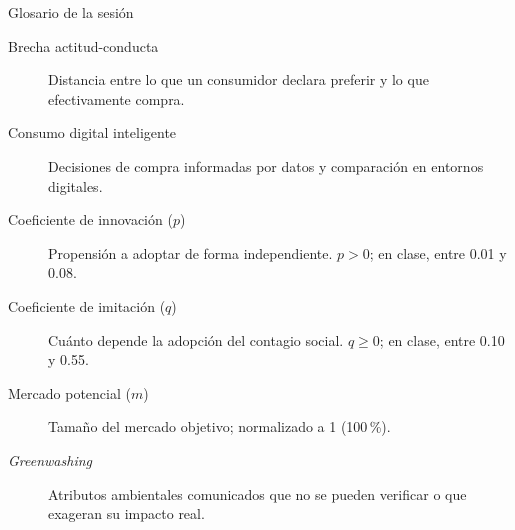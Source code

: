 \documentclass[aspectratio=169,xcolor=dvipsnames]{beamer}
\begin{document}
\begin{frame}{Glosario de la sesión}
\small
\begin{description}
  \item[Brecha actitud-conducta] Distancia entre lo que un consumidor declara preferir y lo que efectivamente compra.
  \item[Consumo digital inteligente] Decisiones de compra informadas por datos y comparación en entornos digitales.
  \item[Coeficiente de innovación ($p$)] Propensión a adoptar de forma independiente. $p>0$; en clase, entre 0.01 y 0.08.
  \item[Coeficiente de imitación ($q$)] Cuánto depende la adopción del contagio social. $q\geq 0$; en clase, entre 0.10 y 0.55.
  \item[Mercado potencial ($m$)] Tamaño del mercado objetivo; normalizado a 1 (100\,\%).
  \item[\textit{Greenwashing}] Atributos ambientales comunicados que no se pueden verificar o que exageran su impacto real.
\end{description}
\end{frame}
\end{document}
